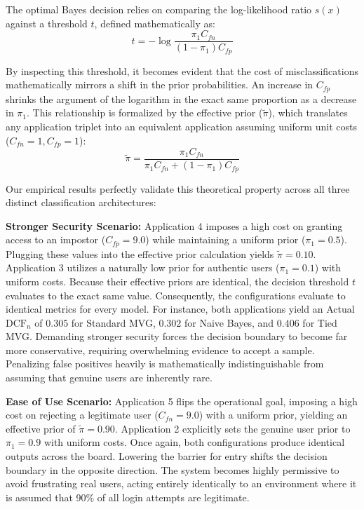 The optimal Bayes decision relies on comparing the log-likelihood ratio $s(x)$ against a threshold $t$, defined mathematically as:
\begin{equation}
    t = -\log \frac{\pi_1 C_{fn}}{(1 - \pi_1) C_{fp}}
\end{equation}

By inspecting this threshold, it becomes evident that the cost of misclassifications mathematically mirrors a shift in the prior probabilities. An increase in $C_{fp}$ shrinks the argument of the logarithm in the exact same proportion as a decrease in $\pi_1$. This relationship is formalized by the effective prior ($\tilde{\pi}$), which translates any application triplet into an equivalent application assuming uniform unit costs ($C_{fn}=1, C_{fp}=1$):
\begin{equation}
    \tilde{\pi} = \frac{\pi_1 C_{fn}}{\pi_1 C_{fn} + (1 - \pi_1) C_{fp}}
\end{equation}

Our empirical results perfectly validate this theoretical property across all three distinct classification architectures:

\textbf{Stronger Security Scenario:} Application 4 imposes a high cost on granting access to an impostor ($C_{fp}=9.0$) while maintaining a uniform prior ($\pi_1=0.5$). Plugging these values into the effective prior calculation yields $\tilde{\pi} = 0.10$. Application 3 utilizes a naturally low prior for authentic users ($\pi_1=0.1$) with uniform costs. Because their effective priors are identical, the decision threshold $t$ evaluates to the exact same value. Consequently, the configurations evaluate to identical metrics for every model. For instance, both applications yield an Actual $\text{DCF}_n$ of $0.305$ for Standard MVG, $0.302$ for Naive Bayes, and $0.406$ for Tied MVG. Demanding stronger security forces the decision boundary to become far more conservative, requiring overwhelming evidence to accept a sample. Penalizing false positives heavily is mathematically indistinguishable from assuming that genuine users are inherently rare.

\textbf{Ease of Use Scenario:} Application 5 flips the operational goal, imposing a high cost on rejecting a legitimate user ($C_{fn}=9.0$) with a uniform prior, yielding an effective prior of $\tilde{\pi} = 0.90$. Application 2 explicitly sets the genuine user prior to $\pi_1=0.9$ with uniform costs. Once again, both configurations produce identical outputs across the board. Lowering the barrier for entry shifts the decision boundary in the opposite direction. The system becomes highly permissive to avoid frustrating real users, acting entirely identically to an environment where it is assumed that 90\% of all login attempts are legitimate.